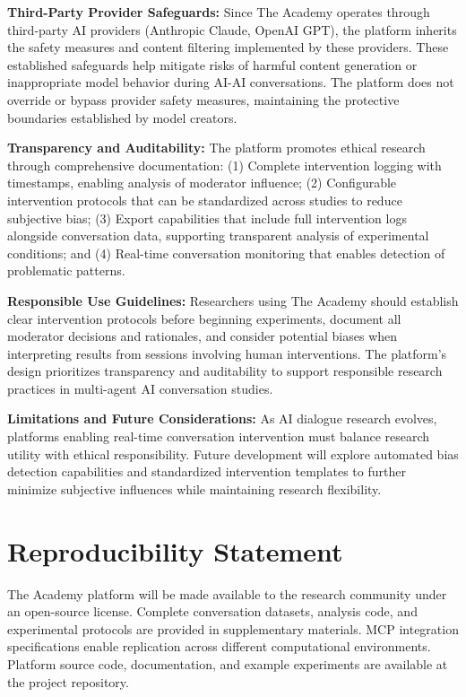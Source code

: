 \documentclass[11pt,letterpaper]{article}
\newcommand{\theacademy}{The Academy}
\newcommand{\mcp}{MCP}
\begin{document}
\textbf{Third-Party Provider Safeguards:} Since The Academy operates through third-party AI providers (Anthropic Claude, OpenAI GPT), the platform inherits the safety measures and content filtering implemented by these providers. These established safeguards help mitigate risks of harmful content generation or inappropriate model behavior during AI-AI conversations. The platform does not override or bypass provider safety measures, maintaining the protective boundaries established by model creators.

\textbf{Transparency and Auditability:} The platform promotes ethical research through comprehensive documentation: (1) Complete intervention logging with timestamps, enabling analysis of moderator influence; (2) Configurable intervention protocols that can be standardized across studies to reduce subjective bias; (3) Export capabilities that include full intervention logs alongside conversation data, supporting transparent analysis of experimental conditions; and (4) Real-time conversation monitoring that enables detection of problematic patterns.

\textbf{Responsible Use Guidelines:} Researchers using The Academy should establish clear intervention protocols before beginning experiments, document all moderator decisions and rationales, and consider potential biases when interpreting results from sessions involving human interventions. The platform's design prioritizes transparency and auditability to support responsible research practices in multi-agent AI conversation studies.

\textbf{Limitations and Future Considerations:} As AI dialogue research evolves, platforms enabling real-time conversation intervention must balance research utility with ethical responsibility. Future development will explore automated bias detection capabilities and standardized intervention templates to further minimize subjective influences while maintaining research flexibility.
\section*{Reproducibility Statement}

\theacademy{} platform will be made available to the research community under an open-source license. Complete conversation datasets, analysis code, and experimental protocols are provided in supplementary materials. \mcp{} integration specifications enable replication across different computational environments. Platform source code, documentation, and example experiments are available at the project repository.
\end{document}
